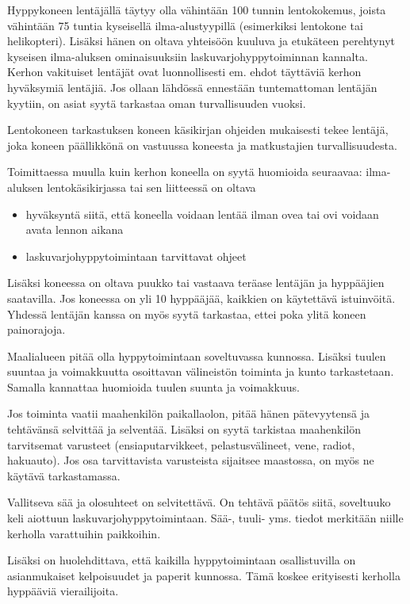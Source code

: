 Hyppykoneen lentäjällä täytyy olla vähintään 100 tunnin lentokokemus, joista vähintään 75 tuntia kyseisellä ilma-alustyypillä (esimerkiksi lentokone tai helikopteri). Lisäksi hänen on oltava yhteisöön kuuluva ja etukäteen perehtynyt kyseisen ilma-aluksen ominaisuuksiin laskuvarjohyppytoiminnan kannalta. Kerhon vakituiset lentäjät ovat luonnollisesti em. ehdot täyttäviä kerhon hyväksymiä lentäjiä. Jos ollaan lähdössä ennestään tuntemattoman lentäjän kyytiin, on asiat syytä tarkastaa oman turvallisuuden vuoksi. 


Lentokoneen tarkastuksen koneen käsikirjan ohjeiden mukaisesti tekee lentäjä, joka koneen päällikkönä on vastuussa koneesta ja matkustajien turvallisuudesta. 


Toimittaessa muulla kuin kerhon koneella on syytä huomioida seuraavaa: ilma-aluksen lentokäsikirjassa tai sen liitteessä on oltava  

\begin{itemize}
\item  hyväksyntä siitä, että koneella voidaan lentää ilman ovea tai ovi voidaan avata lennon aikana 
\item  laskuvarjohyppytoimintaan tarvittavat ohjeet 
\end{itemize}

Lisäksi koneessa on oltava puukko tai vastaava teräase lentäjän ja hyppääjien saatavilla. Jos koneessa on yli 10 hyppääjää, kaikkien on käytettävä istuinvöitä. Yhdessä lentäjän kanssa on myös syytä tarkastaa, ettei poka ylitä koneen painorajoja.  


Maalialueen pitää olla hyppytoimintaan soveltuvassa kunnossa. Lisäksi tuulen suuntaa ja voimakkuutta osoittavan välineistön toiminta ja kunto tarkastetaan. Samalla kannattaa huomioida tuulen suunta ja voimakkuus. 


Jos toiminta vaatii maahenkilön paikallaolon, pitää hänen pätevyytensä ja tehtävänsä selvittää ja selventää. Lisäksi on syytä tarkistaa maahenkilön tarvitsemat varusteet (ensiaputarvikkeet, pelastusvälineet, vene, radiot, hakuauto). Jos osa tarvittavista varusteista sijaitsee maastossa, on myös ne käytävä tarkastamassa. 


Vallitseva sää ja olosuhteet on selvitettävä. On tehtävä päätös siitä, soveltuuko keli aiottuun laskuvarjohyppytoimintaan. Sää\mbox{-,} tuuli- yms. tiedot merkitään niille kerholla varattuihin paikkoihin. 


Lisäksi on huolehdittava, että kaikilla hyppytoimintaan osallistuvilla on asianmukaiset kelpoisuudet ja paperit kunnossa. Tämä koskee erityisesti kerholla hyppääviä vierailijoita. 


